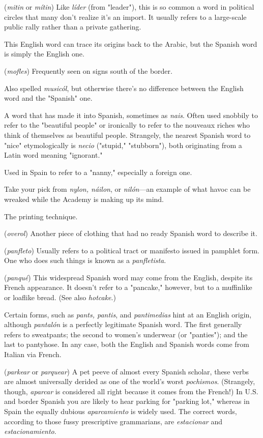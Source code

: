  (\emph{mitin} or \emph{mítin}) Like \emph{líder} (from "leader"), this is
so common a word in political circles that many don't realize it's an
import. It usually refers to a large-scale public rally rather than a private gathering.

 This English word can trace its origins back to the
Arabic, but the Spanish word is simply the English one.

 (\emph{mofles}) Frequently seen on signs south of the
border.

 Also spelled \emph{musicól}, but otherwise there's no
difference between the English word and the "Spanish" one.

 A word that has made it into Spanish, sometimes as
\emph{nais}. Often used snobbily to refer to the "beautiful people" or ironically to refer to the nouveaux riches who think of themselves as beautiful people. Strangely, the nearest Spanish word to "nice" etymologically is \emph{necio} ("stupid," "stubborn"), both originating from a Latin
word meaning "ignorant."

 Used in Spain to refer to a "nanny," especially a foreign one.

 Take your pick from \emph{nylon, náilon}, or \emph{nilón}---an example of what havoc can be wreaked while the Academy is making up
its mind.

 The printing technique.

 (\emph{overol}) Another piece of clothing that had no
ready Spanish word to describe it.

 (\emph{panfleto}) Usually refers to a political tract or manifesto issued in pamphlet form. One who does such things is known as
a \emph{panfletista}.

 (\emph{panqué}) This widespread Spanish word may come
from the English, despite its French appearance. It doesn't refer to a
"pancake," however, but to a muffinlike or loaflike bread. (See also
\emph{hotcake}.)

 Certain forms, such as \emph{pants, pantis}, and \emph{pantimedias} hint at an English origin, although \emph{pantalón} is a perfectly legitimate Spanish word. The first generally refers to sweatpants; the second to women's underwear (or "panties"); and the last to pantyhose.
In any case, both the English and Spanish words come from Italian via
French.

 (\emph{parkear} or \emph{parquear}) A pet peeve of almost every
Spanish scholar, these verbs are almost universally derided as one of
the world's worst \emph{pochismos}. (Strangely, though, \emph{aparcar} is considered
all right because it comes from the French!) In U.S. and border Spanish
you are likely to hear parking for "parking lot," whereas in Spain the
equally dubious \emph{aparcamiento} is widely used. The correct words, according to those fussy prescriptive grammarians, are \emph{estacionar} and
\emph{estacionamiento}.

